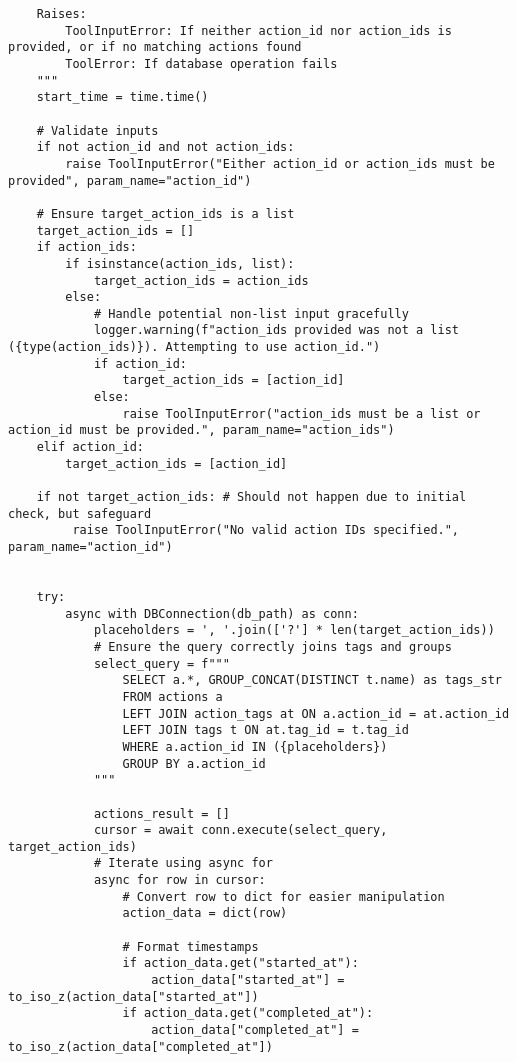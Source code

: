 \documentclass[12pt,a4paper]{article}
\begin{document}
\begin{pageablecode}
\begin{verbatim}
    Raises:
        ToolInputError: If neither action_id nor action_ids is provided, or if no matching actions found
        ToolError: If database operation fails
    """
    start_time = time.time()

    # Validate inputs
    if not action_id and not action_ids:
        raise ToolInputError("Either action_id or action_ids must be provided", param_name="action_id")

    # Ensure target_action_ids is a list
    target_action_ids = []
    if action_ids:
        if isinstance(action_ids, list):
            target_action_ids = action_ids
        else:
            # Handle potential non-list input gracefully
            logger.warning(f"action_ids provided was not a list ({type(action_ids)}). Attempting to use action_id.")
            if action_id:
                target_action_ids = [action_id]
            else:
                raise ToolInputError("action_ids must be a list or action_id must be provided.", param_name="action_ids")
    elif action_id:
        target_action_ids = [action_id]

    if not target_action_ids: # Should not happen due to initial check, but safeguard
         raise ToolInputError("No valid action IDs specified.", param_name="action_id")


    try:
        async with DBConnection(db_path) as conn:
            placeholders = ', '.join(['?'] * len(target_action_ids))
            # Ensure the query correctly joins tags and groups
            select_query = f"""
                SELECT a.*, GROUP_CONCAT(DISTINCT t.name) as tags_str
                FROM actions a
                LEFT JOIN action_tags at ON a.action_id = at.action_id
                LEFT JOIN tags t ON at.tag_id = t.tag_id
                WHERE a.action_id IN ({placeholders})
                GROUP BY a.action_id
            """

            actions_result = []
            cursor = await conn.execute(select_query, target_action_ids)
            # Iterate using async for
            async for row in cursor:
                # Convert row to dict for easier manipulation
                action_data = dict(row)

                # Format timestamps
                if action_data.get("started_at"):
                    action_data["started_at"] = to_iso_z(action_data["started_at"])
                if action_data.get("completed_at"):
                    action_data["completed_at"] = to_iso_z(action_data["completed_at"])


\end{verbatim}
\end{pageablecode}
\end{document}

